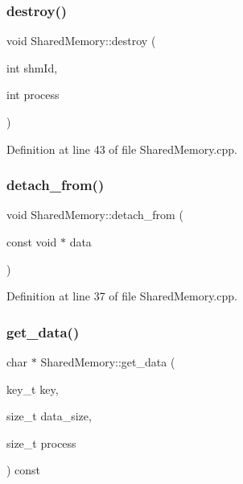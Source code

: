 \subsubsection{\texorpdfstring{destroy()}{destroy()}}
{\footnotesize\ttfamily void Shared\+Memory\+::destroy (\begin{DoxyParamCaption}\item[{int}]{shm\+Id,  }\item[{int}]{process }\end{DoxyParamCaption})\hspace{0.3cm}{\ttfamily [static]}}



Definition at line 43 of file Shared\+Memory.\+cpp.

\mbox{\label{class_shared_memory_af5531b0b30d05f359719e406886aa61e}} 
\subsubsection{\texorpdfstring{detach\+\_\+from()}{detach\_from()}}
{\footnotesize\ttfamily void Shared\+Memory\+::detach\+\_\+from (\begin{DoxyParamCaption}\item[{const void $\ast$}]{data }\end{DoxyParamCaption})}



Definition at line 37 of file Shared\+Memory.\+cpp.

\mbox{\label{class_shared_memory_a35b6a9038b69b6abd3128cd028670cf6}} 
\subsubsection{\texorpdfstring{get\+\_\+data()}{get\_data()}}
{\footnotesize\ttfamily char $\ast$ Shared\+Memory\+::get\+\_\+data (\begin{DoxyParamCaption}\item[{key\+\_\+t}]{key,  }\item[{size\+\_\+t}]{data\+\_\+size,  }\item[{size\+\_\+t}]{process }\end{DoxyParamCaption}) const}



